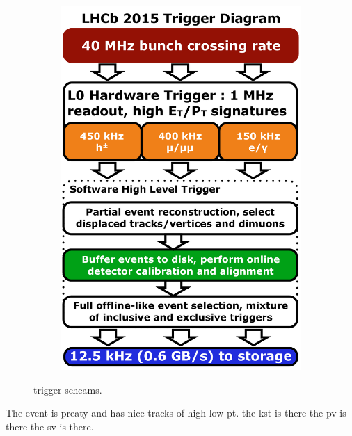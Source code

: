 \begin{figure}[t]
\begin{subfigure}{0.5\textwidth}
    \includegraphics[width=\textwidth]{Figures/Chapter2/LHCb_Trigger_RunII_May2015}
    \caption{}
  \end{subfigure}
  \caption{ trigger scheams.}
  \label{det_evt_display}
\end{figure}

The event is preaty and has nice tracks of high-low pt. the kst is there the pv is there the sv is there.
